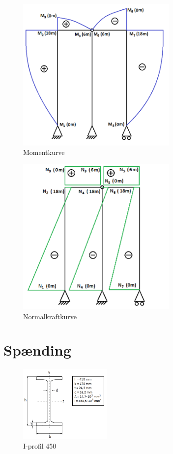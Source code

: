 \begin{figure}[H]
	\centering
	\includegraphics[width=0.7\textwidth]{billeder/skkm.png}
	\caption{Momentkurve}
	\label{fig:momentkurve}
\end{figure}

\begin{figure}[H]
	\centering
	\includegraphics[width=0.7\textwidth]{billeder/SKFN.png}
	\caption{Normalkraftkurve}
	\label{fig:normalkraftkurve}
\end{figure}

\section{Spænding}
\begin{figure}[H]
	\centering
	\includegraphics[width=0.4\textwidth]{billeder/iprofil.png}
	\caption{I-profil 450}
	\label{fig:iprofil}
\end{figure}

